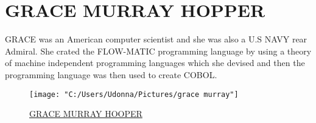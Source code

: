 \documentclass{article}
\begin{document}
	\section{GRACE MURRAY HOPPER} GRACE was an American computer scientist and she was also a U.S NAVY rear Admiral.
	She crated the FLOW-MATIC programming language by using a theory of machine independent programming languages which she devised and then the programming language was then used to create COBOL.
\begin{figure}
	\centering
	\texttt{[image: "C:/Users/Udonna/Pictures/grace murray"]}
	\caption{}
	\label{fig:grace-murray} \underline{GRACE MURRAY HOOPER}
\end{figure}
\end{document}
